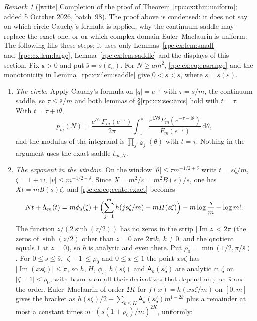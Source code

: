 \documentclass[11pt]{article}
\theoremstyle{definition}
\theoremstyle{remark}
\newtheorem{remark}[theorem]{Remark}
\newcommand{\ii}{\mathrm i}
\newcommand{\dd}{\,\mathrm d}
\numberwithin{equation}{section}
\begin{document}
\begin{remark}[\textsf{[write]} Completion of the proof of Theorem~\ref{rpc:cx:thm:uniform}; added 5 October 2026, batch~98]
\label{rpc:cx:rem:completion}
The proof above is condensed: it does not say on which circle Cauchy's
formula is applied, why the continuum saddle may replace the exact one, or
on which complex domain Euler--Maclaurin is uniform. The following fills
these steps; it uses only Lemmas~\ref{rpc:cx:lem:small}
and~\ref{rpc:cx:lem:large}, Lemma~\ref{rpc:cx:lem:saddle} and the
displays of this section. Fix $a>0$ and put $\bar s=s(\varepsilon_a)$. For
$N\ge am^2$, \eqref{rpc:cx:eq:epsrange} and the monotonicity in
Lemma~\ref{rpc:cx:lem:saddle} give $0<s<\bar s$, where $s=s(\varepsilon)$.
\begin{enumerate}[label=(\roman*)]
\item \emph{The circle.} Apply Cauchy's formula on $|q|=e^{-\tau}$ with
 $\tau=s/m$, the continuum saddle, so $\tau\le\bar s/m$ and both lemmas of
 \S\ref{rpc:cx:sec:arcs} hold with $t=\tau$. With $t=\tau+\ii\theta$,
 \[
  p_m(N)=\frac{e^{N\tau}F_m(e^{-\tau})}{2\pi}\int_{-\pi}^{\pi}
  \frac{e^{\ii N\theta}F_m(e^{-\tau-\ii\theta})}{F_m(e^{-\tau})}\dd\theta,
 \]
 and the modulus of the integrand is $\prod_j\varrho_j(\theta)$ with
 $t=\tau$. Nothing in the argument uses the exact saddle $t_{m,N}$.
\item \emph{The exponent in the window.} On the window
 $|\theta|\le\tau m^{-1/2+\delta}$ write $t=s\zeta/m$, $\zeta=1+\ii v$,
 $|v|\le m^{-1/2+\delta}$. Since $X=m^2/\varepsilon=m^2B(s)/s$, one has
 $Xt=mB(s)\zeta$, and \eqref{rpc:cx:eq:centerexact} becomes
 \[
  Nt+\Lambda_m(t)=m\phi_s(\zeta)
  +\Bigl(\sum_{j=1}^mh(js\zeta/m)-mH(s\zeta)\Bigr)
  -m\log\frac sm-\log m!.
 \]
 The function $z/(2\sinh(z/2))$ has no zeros in the strip
 $|\operatorname{Im}z|<2\pi$ (the zeros of $\sinh(z/2)$ other than $z=0$
 are $2\pi\ii k$, $k\ne0$, and the quotient equals $1$ at $z=0$), so $h$ is
 analytic and even there. Put $\rho_0=\min(1/2,\pi/\bar s)$. For
 $0\le s\le\bar s$, $|\zeta-1|\le\rho_0$ and $0\le x\le1$ the point
 $xs\zeta$ has $|\operatorname{Im}(xs\zeta)|\le\pi$, so $h$, $H$, $\phi_s$,
 $h(s\zeta)$ and $\mathsf A_k(s\zeta)$ are analytic in $\zeta$ on
 $|\zeta-1|\le\rho_0$, with bounds on all their derivatives that depend only
 on $\bar s$ and the order. Euler--Maclaurin of order $2K$ for
 $f(x)=h(xs\zeta/m)$ on $[0,m]$ gives the bracket as
 $h(s\zeta)/2+\sum_{k\le K}\mathsf A_k(s\zeta)m^{1-2k}$ plus a remainder
 at most a constant times $m\cdot(\bar s(1+\rho_0)/m)^{2K}$, uniformly:

\end{enumerate}
\end{remark}
\end{document}
